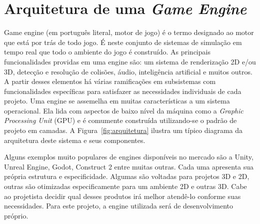 \documentclass[12pt, 
openright, 
oneside, 
a4paper,    
brazil]{facom-ufu-abntex2}
\begin{document}
\chapter{Arquitetura de uma \textit{Game Engine}}
Game engine (em português literal, motor de jogo) é o termo designado ao motor que está por trás de todo jogo. É neste conjunto de sistemas de simulação em tempo real que todo o ambiente do jogo é construído. As principais funcionalidades providas em uma engine são: um sistema de renderização 2D e/ou 3D, detecção e resolução de colisões, áudio, inteligência artificial e muitos outros. A partir desses elementos há várias ramificações em subsistemas com funcionalidades específicas para satisfazer as necessidades individuais de cada projeto. Uma engine se assemelha em muitas características a um sistema operacional. Ela lida com aspectos de baixo nível da máquina como a \textit{Graphic Processing Unit} (GPU) e é comumente construída utilizando-se o padrão de projeto em camadas. A Figura~\ref{fig:arquitetura}  ilustra um típico diagrama da arquitetura deste sistema e seus componentes.

Alguns exemplos muito populares de engines disponíveis no mercado são a Unity, Unreal Engine, Godot, Construct 2 entre muitas outras. Cada uma apresenta sua própria estrutura e especificidade. Algumas são voltadas para projetos 3D e 2D, outras são otimizadas especificamente para um ambiente 2D e outras 3D. Cabe ao projetista decidir qual desses produtos irá melhor atendê-lo conforme suas necessidades. Para este projeto, a engine utilizada será de desenvolvimento próprio.
\end{document}
